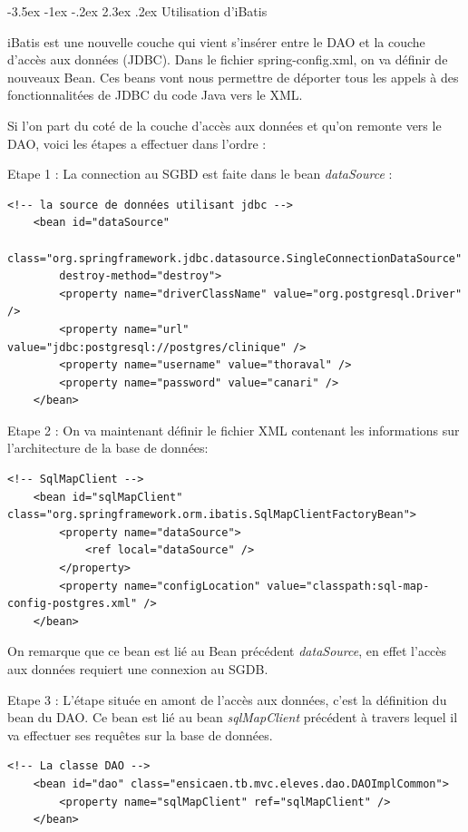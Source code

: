 \documentclass[a4paper,12pt]{article}
\makeatletter
\renewcommand\section{\@startsection {section}{1}{\z@}%
                           {-3.5ex \@plus -1ex \@minus -.2ex}%
                           {2.3ex \@plus.2ex}%
                           {\normalfont\Large\bfseries}}
\makeatother
\begin{document}
\section{Utilisation d'iBatis}

iBatis est une nouvelle couche qui vient s'insérer entre le DAO et la couche d'accès aux données (JDBC).
Dans le fichier spring-config.xml, on va définir de nouveaux Bean. Ces beans vont nous permettre de déporter tous les appels à des fonctionnalitées de 
JDBC du code Java vers le XML.

Si l'on part du coté de la couche d'accès aux données et qu'on remonte vers le DAO, voici les étapes a effectuer dans l'ordre :

Etape 1 : La connection au SGBD est faite dans le bean \textit{dataSource} : 

\begin{lstlisting}
<!-- la source de données utilisant jdbc -->
	<bean id="dataSource"
		class="org.springframework.jdbc.datasource.SingleConnectionDataSource"
		destroy-method="destroy">
		<property name="driverClassName" value="org.postgresql.Driver" />
		<property name="url" value="jdbc:postgresql://postgres/clinique" />
		<property name="username" value="thoraval" />
		<property name="password" value="canari" />
	</bean>
\end{lstlisting}

Etape 2 : On va maintenant définir le fichier XML contenant les informations sur l'architecture de la base de données:

\begin{lstlisting}
<!-- SqlMapClient -->
	<bean id="sqlMapClient" class="org.springframework.orm.ibatis.SqlMapClientFactoryBean">
		<property name="dataSource">
			<ref local="dataSource" />
		</property>
		<property name="configLocation" value="classpath:sql-map-config-postgres.xml" />
	</bean>
\end{lstlisting}

On remarque que ce bean est lié au Bean précédent \textit{dataSource}, en effet l'accès aux données requiert une connexion au SGDB.

Etape 3 : L'étape située en amont de l'accès aux données, c'est la définition du bean du DAO. Ce bean est lié au bean \textit{sqlMapClient} précédent
à travers lequel il va effectuer ses requêtes sur la base de données.

\begin{lstlisting}
<!-- La classe DAO -->
	<bean id="dao" class="ensicaen.tb.mvc.eleves.dao.DAOImplCommon">
		<property name="sqlMapClient" ref="sqlMapClient" />
	</bean>
\end{lstlisting}
\end{document}
